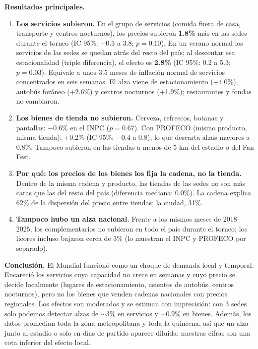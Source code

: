 \documentclass[11pt,letterpaper]{article}
\begin{document}
\textbf{Resultados principales.}
\begin{enumerate}
\item \textbf{Los servicios subieron.} En el grupo de servicios (comida fuera de casa, transporte
  y centros nocturnos), los precios subieron \textbf{1.8\%} más en las sedes durante el torneo
  (IC 95\%: $-0.3$ a 3.8; $p=0.10$). En un verano normal los servicios de las sedes se quedan atrás del resto del país;
  al descontar esa estacionalidad (triple diferencia), el efecto es \textbf{2.8\%} (IC 95\%: 0.2
  a 5.3; $p=0.03$). Equivale a unos 3.5 meses de inflación normal de servicios concentrados en
  seis semanas. El alza viene de estacionamiento (+4.0\%), autobús foráneo (+2.6\%) y centros
  nocturnos (+1.9\%); restaurantes y fondas no cambiaron.
\item \textbf{Los bienes de tienda no subieron.} Cerveza, refrescos, botanas y pantallas: $-0.6\%$
  en el INPC ($p=0.67$). Con PROFECO (mismo producto, misma tienda): +0.2\% (IC 95\%: $-0.4$ a
  0.8), lo que descarta alzas mayores a 0.8\%. Tampoco subieron en las tiendas a menos de 5 km del
  estadio o del Fan Fest.
\item \textbf{Por qué: los precios de los bienes los fija la cadena, no la tienda.} Dentro de la
  misma cadena y producto, las tiendas de las sedes no son más caras que las del resto del país
  (diferencia mediana: 0.0\%). La cadena explica 62\% de la dispersión del precio entre tiendas;
  la ciudad, 31\%.
\item \textbf{Tampoco hubo un alza nacional.} Frente a los mismos meses de 2018--2025, los
  complementarios no subieron en todo el país durante el torneo; los licores incluso bajaron
  cerca de 3\% (lo muestran el INPC y PROFECO por separado).
\end{enumerate}

\textbf{Conclusión.} El Mundial funcionó como un choque de demanda local y temporal. Encareció los
servicios cuya capacidad no crece en semanas y cuyo precio se decide localmente (lugares de
estacionamiento, asientos de autobús, centros nocturnos), pero no los bienes que venden cadenas
nacionales con precios regionales. Los efectos son moderados y se estiman con imprecisión: con 3
sedes solo podemos detectar alzas de ${\sim}3\%$ en servicios y ${\sim}0.9\%$ en bienes. Además,
los datos promedian toda la zona metropolitana y toda la quincena, así que un alza junto al
estadio o solo en días de partido aparece diluida: nuestras cifras son una cota inferior del
efecto local.
\end{document}
